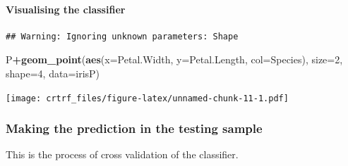 \documentclass[
]{article}
\newenvironment{Shaded}{\begin{snugshade}}{\end{snugshade}}
\newcommand{\DataTypeTok}[1]{\textcolor[rgb]{0.13,0.29,0.53}{#1}}
\newcommand{\DecValTok}[1]{\textcolor[rgb]{0.00,0.00,0.81}{#1}}
\newcommand{\KeywordTok}[1]{\textcolor[rgb]{0.13,0.29,0.53}{\textbf{#1}}}
\newcommand{\NormalTok}[1]{#1}
\newcommand{\OperatorTok}[1]{\textcolor[rgb]{0.81,0.36,0.00}{\textbf{#1}}}
\newcommand{\StringTok}[1]{\textcolor[rgb]{0.31,0.60,0.02}{#1}}
\begin{document}
\hypertarget{visualising-the-classifier}{%
\paragraph{Visualising the
classifier}\label{visualising-the-classifier}}

\begin{Shaded}
\end{Shaded}

\begin{verbatim}
## Warning: Ignoring unknown parameters: Shape
\end{verbatim}

\begin{Shaded}
\begin{Highlighting}[]
\NormalTok{P}\OperatorTok{+}\KeywordTok{geom_point}\NormalTok{(}\KeywordTok{aes}\NormalTok{(}\DataTypeTok{x=}\NormalTok{Petal.Width, }\DataTypeTok{y=}\NormalTok{Petal.Length, }\DataTypeTok{col=}\NormalTok{Species), }\DataTypeTok{size=}\DecValTok{2}\NormalTok{, }\DataTypeTok{shape=}\DecValTok{4}\NormalTok{, }\DataTypeTok{data=}\NormalTok{irisP)}
\end{Highlighting}
\end{Shaded}

\texttt{[image: crtrf\_files/figure-latex/unnamed-chunk-11-1.pdf]}

\hypertarget{making-the-prediction-in-the-testing-sample}{%
\subsubsection{Making the prediction in the testing
sample}\label{making-the-prediction-in-the-testing-sample}}

This is the process of cross validation of the classifier.
\end{document}
